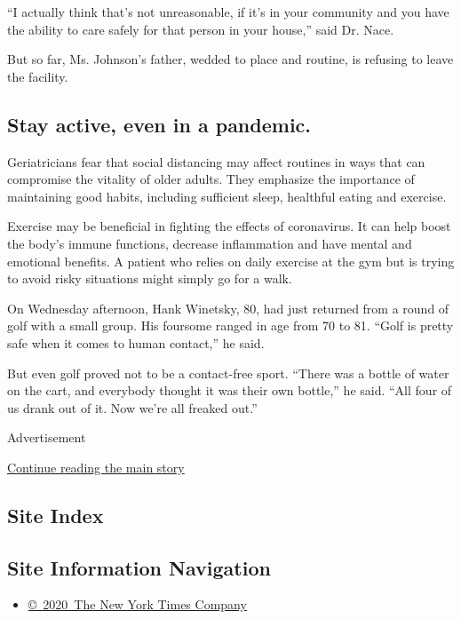 ``I actually think that's not unreasonable, if it's in your community
and you have the ability to care safely for that person in your house,''
said Dr. Nace.

But so far, Ms. Johnson's father, wedded to place and routine, is
refusing to leave the facility.

\hypertarget{stay-active-even-in-a-pandemic}{%
\subsection{Stay active, even in a
pandemic.}\label{stay-active-even-in-a-pandemic}}

Geriatricians fear that social distancing may affect routines in ways
that can compromise the vitality of older adults. They emphasize the
importance of maintaining good habits, including sufficient sleep,
healthful eating and exercise.

Exercise may be beneficial in fighting the effects of coronavirus. It
can help boost the body's immune functions, decrease inflammation and
have mental and emotional benefits. A patient who relies on daily
exercise at the gym but is trying to avoid risky situations might simply
go for a walk.

On Wednesday afternoon, Hank Winetsky, 80, had just returned from a
round of golf with a small group. His foursome ranged in age from 70 to
81. ``Golf is pretty safe when it comes to human contact,'' he said.

But even golf proved not to be a contact-free sport. ``There was a
bottle of water on the cart, and everybody thought it was their own
bottle,'' he said. ``All four of us drank out of it. Now we're all
freaked out.''

Advertisement

\protect\hyperlink{after-bottom}{Continue reading the main story}

\hypertarget{site-index}{%
\subsection{Site Index}\label{site-index}}

\hypertarget{site-information-navigation}{%
\subsection{Site Information
Navigation}\label{site-information-navigation}}

\begin{itemize}
\tightlist
\item
  \href{https://help.nytimes3xbfgragh.onion/hc/en-us/articles/115014792127-Copyright-notice}{©~2020~The
  New York Times Company}
\end{itemize}

